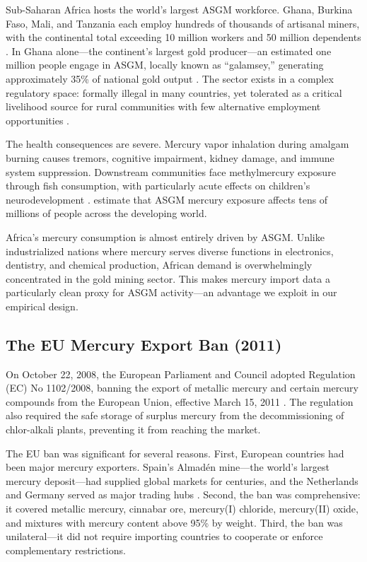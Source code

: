 \documentclass[12pt]{article}
\begin{document}
Sub-Saharan Africa hosts the world's largest ASGM workforce. Ghana, Burkina Faso, Mali, and Tanzania each employ hundreds of thousands of artisanal miners, with the continental total exceeding 10 million workers and 50 million dependents \citep{hilson2017small}. In Ghana alone---the continent's largest gold producer---an estimated one million people engage in ASGM, locally known as ``galamsey,'' generating approximately 35\% of national gold output \citep{bansah2018small}. The sector exists in a complex regulatory space: formally illegal in many countries, yet tolerated as a critical livelihood source for rural communities with few alternative employment opportunities \citep{hilson2007small}.

The health consequences are severe. Mercury vapor inhalation during amalgam burning causes tremors, cognitive impairment, kidney damage, and immune system suppression. Downstream communities face methylmercury exposure through fish consumption, with particularly acute effects on children's neurodevelopment \citep{basu2015mercury, steckling2017global}. \citet{spiegel2009reducing} estimate that ASGM mercury exposure affects tens of millions of people across the developing world.

Africa's mercury consumption is almost entirely driven by ASGM. Unlike industrialized nations where mercury serves diverse functions in electronics, dentistry, and chemical production, African demand is overwhelmingly concentrated in the gold mining sector. This makes mercury import data a particularly clean proxy for ASGM activity---an advantage we exploit in our empirical design.

\subsection{The EU Mercury Export Ban (2011)}

On October 22, 2008, the European Parliament and Council adopted Regulation (EC) No 1102/2008, banning the export of metallic mercury and certain mercury compounds from the European Union, effective March 15, 2011 \citep{ec2008mercury}. The regulation also required the safe storage of surplus mercury from the decommissioning of chlor-alkali plants, preventing it from reaching the market.

The EU ban was significant for several reasons. First, European countries had been major mercury exporters. Spain's Almad\'{e}n mine---the world's largest mercury deposit---had supplied global markets for centuries, and the Netherlands and Germany served as major trading hubs \citep{hylander2006mercury}. Second, the ban was comprehensive: it covered metallic mercury, cinnabar ore, mercury(I) chloride, mercury(II) oxide, and mixtures with mercury content above 95\% by weight. Third, the ban was unilateral---it did not require importing countries to cooperate or enforce complementary restrictions.
\end{document}
